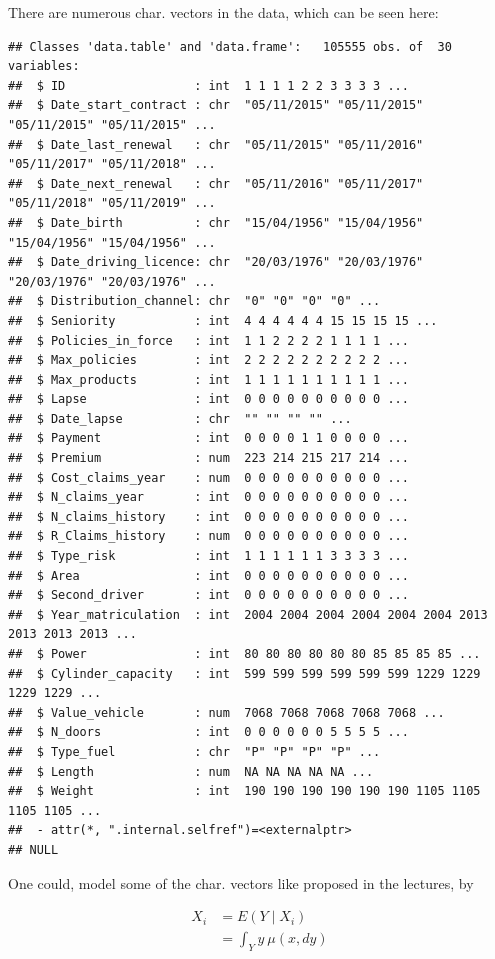 \documentclass[
]{article}
\begin{document}
There are numerous char. vectors in the data, which can be seen here:

\begin{verbatim}
## Classes 'data.table' and 'data.frame':   105555 obs. of  30 variables:
##  $ ID                  : int  1 1 1 1 2 2 3 3 3 3 ...
##  $ Date_start_contract : chr  "05/11/2015" "05/11/2015" "05/11/2015" "05/11/2015" ...
##  $ Date_last_renewal   : chr  "05/11/2015" "05/11/2016" "05/11/2017" "05/11/2018" ...
##  $ Date_next_renewal   : chr  "05/11/2016" "05/11/2017" "05/11/2018" "05/11/2019" ...
##  $ Date_birth          : chr  "15/04/1956" "15/04/1956" "15/04/1956" "15/04/1956" ...
##  $ Date_driving_licence: chr  "20/03/1976" "20/03/1976" "20/03/1976" "20/03/1976" ...
##  $ Distribution_channel: chr  "0" "0" "0" "0" ...
##  $ Seniority           : int  4 4 4 4 4 4 15 15 15 15 ...
##  $ Policies_in_force   : int  1 1 2 2 2 2 1 1 1 1 ...
##  $ Max_policies        : int  2 2 2 2 2 2 2 2 2 2 ...
##  $ Max_products        : int  1 1 1 1 1 1 1 1 1 1 ...
##  $ Lapse               : int  0 0 0 0 0 0 0 0 0 0 ...
##  $ Date_lapse          : chr  "" "" "" "" ...
##  $ Payment             : int  0 0 0 0 1 1 0 0 0 0 ...
##  $ Premium             : num  223 214 215 217 214 ...
##  $ Cost_claims_year    : num  0 0 0 0 0 0 0 0 0 0 ...
##  $ N_claims_year       : int  0 0 0 0 0 0 0 0 0 0 ...
##  $ N_claims_history    : int  0 0 0 0 0 0 0 0 0 0 ...
##  $ R_Claims_history    : num  0 0 0 0 0 0 0 0 0 0 ...
##  $ Type_risk           : int  1 1 1 1 1 1 3 3 3 3 ...
##  $ Area                : int  0 0 0 0 0 0 0 0 0 0 ...
##  $ Second_driver       : int  0 0 0 0 0 0 0 0 0 0 ...
##  $ Year_matriculation  : int  2004 2004 2004 2004 2004 2004 2013 2013 2013 2013 ...
##  $ Power               : int  80 80 80 80 80 80 85 85 85 85 ...
##  $ Cylinder_capacity   : int  599 599 599 599 599 599 1229 1229 1229 1229 ...
##  $ Value_vehicle       : num  7068 7068 7068 7068 7068 ...
##  $ N_doors             : int  0 0 0 0 0 0 5 5 5 5 ...
##  $ Type_fuel           : chr  "P" "P" "P" "P" ...
##  $ Length              : num  NA NA NA NA NA ...
##  $ Weight              : int  190 190 190 190 190 190 1105 1105 1105 1105 ...
##  - attr(*, ".internal.selfref")=<externalptr> 
## NULL
\end{verbatim}

One could, model some of the char. vectors like proposed in the
lectures, by

\begin{align*}
 X_i &= E(Y \mid X_i ) \\
 &=\int_Y y\ \mu(x, dy)
\end{align*}
\end{document}

